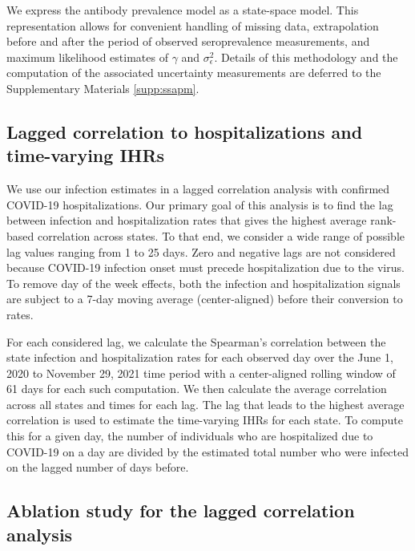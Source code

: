 \documentclass{article}
\begin{document}
We express the antibody prevalence model as a state-space model. This
representation allows for convenient handling of missing data, extrapolation
before and after the period of observed seroprevalence measurements, and maximum
likelihood estimates of $\gamma$ and $\sigma^2_\epsilon$. Details of this
methodology and the computation of the associated uncertainty measurements are
deferred to the Supplementary Materials \ref{supp:ssapm}.


\subsection{Lagged correlation to hospitalizations and time-varying IHRs} 

We use our infection estimates in a lagged correlation analysis with confirmed
COVID-19 hospitalizations. Our primary goal of this analysis is to find the lag
between infection and hospitalization rates that gives the highest average
rank-based correlation across \US states. To that end, we consider a wide range
of possible lag values ranging from 1 to 25 days. Zero and negative lags are not
considered because COVID-19 infection onset must precede hospitalization due to
the virus. To remove day of the week effects, both the infection and
hospitalization signals are subject to a 7-day moving average (center-aligned)
before their conversion to rates.

For each considered lag, we calculate the Spearman's correlation between the 
state infection and hospitalization rates for each observed day 
over the June 1, 2020 to November 29, 2021
time period %
with a center-aligned rolling window of 61 days for each such computation.
We then calculate the average correlation across all states and times for each lag. 
The lag that leads to the highest average correlation is used to estimate 
the time-varying IHRs for each
state. To compute this for a given day, the number of individuals who are
hospitalized due to COVID-19 on a day are divided by the estimated total number
who were infected on the lagged number of days before.

\subsection{Ablation study for the lagged correlation analysis} 
\end{document}

